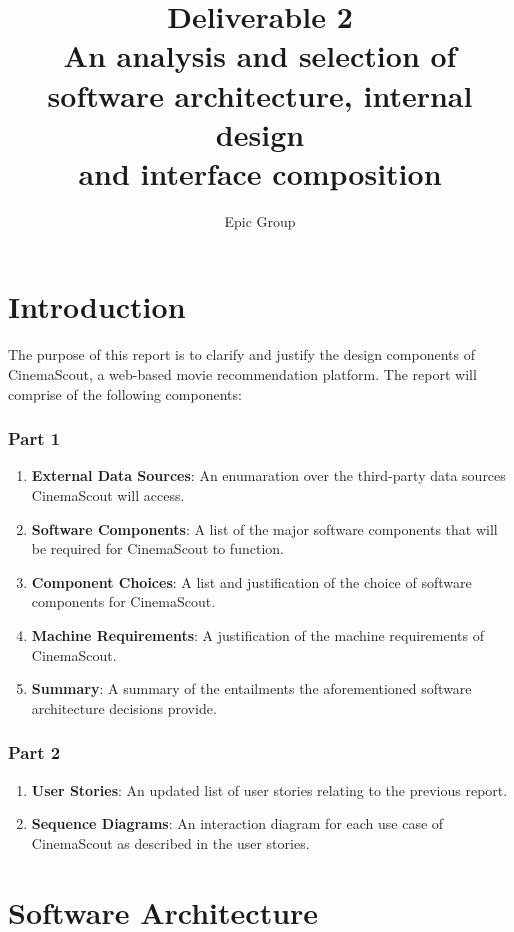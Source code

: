 \documentclass{article}
\begin{document}
\title{%
 Deliverable 2\\
 \large An analysis and selection of software architecture, internal design\\
 \large and interface composition
}
\author{Epic Group}
\date{}
\maketitle

\section*{Introduction}
The purpose of this report is to clarify and justify the design components of 
CinemaScout, a web-based movie recommendation platform. The report will comprise
of the following components:
\subsubsection*{Part 1}
\begin{enumerate}
\item \textbf{External Data Sources}: An enumaration over the third-party data
sources CinemaScout will access.
\item \textbf{Software Components}: A list of the major software components
that will be required for CinemaScout to function.
\item \textbf{Component Choices}: A list and justification of the choice of
software components for CinemaScout.
\item \textbf{Machine Requirements}: A justification of the machine requirements
of CinemaScout.
\item \textbf{Summary}: A summary of the entailments the aforementioned
software architecture decisions provide.
\end{enumerate}
\subsubsection*{Part 2}
\begin{enumerate}
\item \textbf{User Stories}: An updated list of user stories relating to the
previous report.
\item \textbf{Sequence Diagrams}: An interaction diagram for each use case
of CinemaScout as described in the user stories.
\end{enumerate}
\section{Software Architecture}
\end{document}
